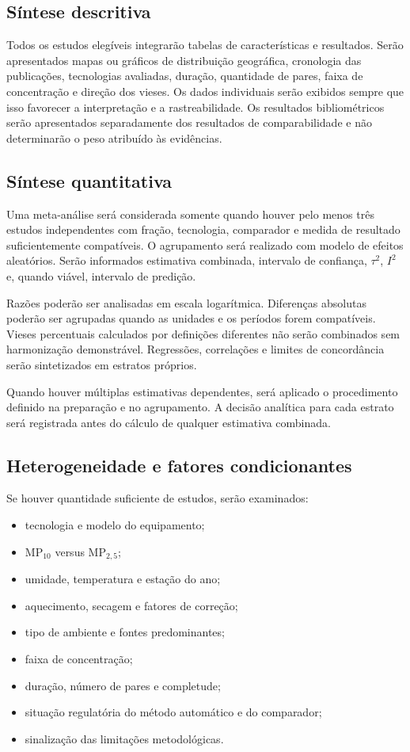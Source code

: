 \documentclass[11pt,a4paper]{article}
\newcommand{\MPdez}{MP$_{10}$}
\newcommand{\MPdoiscinco}{MP$_{2,5}$}
\begin{document}
\subsection{Síntese descritiva}

Todos os estudos elegíveis integrarão tabelas de características e resultados. Serão
apresentados mapas ou gráficos de distribuição geográfica, cronologia das publicações,
tecnologias avaliadas, duração, quantidade de pares, faixa de concentração e direção
dos vieses. Os dados individuais serão exibidos sempre que isso favorecer a
interpretação e a rastreabilidade. Os resultados bibliométricos serão apresentados
separadamente dos resultados de comparabilidade e não determinarão o peso atribuído às
evidências.

\subsection{Síntese quantitativa}

Uma meta-análise será considerada somente quando houver pelo menos três estudos
independentes com fração, tecnologia, comparador e medida de resultado suficientemente
compatíveis. O agrupamento será realizado com modelo de efeitos aleatórios. Serão
informados estimativa combinada, intervalo de confiança, $\tau^2$, $I^2$ e, quando
viável, intervalo de predição.

Razões poderão ser analisadas em escala logarítmica. Diferenças absolutas poderão ser
agrupadas quando as unidades e os períodos forem compatíveis. Vieses percentuais
calculados por definições diferentes não serão combinados sem harmonização
demonstrável. Regressões, correlações e limites de concordância serão sintetizados em
estratos próprios.

Quando houver múltiplas estimativas dependentes, será aplicado o procedimento definido
na preparação e no agrupamento. A decisão analítica para cada estrato será registrada
antes do cálculo de qualquer estimativa combinada.

\subsection{Heterogeneidade e fatores condicionantes}

Se houver quantidade suficiente de estudos, serão examinados:

\begin{itemize}
  \item tecnologia e modelo do equipamento;
  \item \MPdez{} versus \MPdoiscinco{};
  \item umidade, temperatura e estação do ano;
  \item aquecimento, secagem e fatores de correção;
  \item tipo de ambiente e fontes predominantes;
  \item faixa de concentração;
  \item duração, número de pares e completude;
  \item situação regulatória do método automático e do comparador;
  \item sinalização das limitações metodológicas.
\end{itemize}
\end{document}
